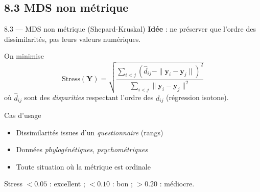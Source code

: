 \subsection{8.3 MDS non métrique}
\begin{frame}{8.3 — MDS non métrique (Shepard-Kruskal)}
\textbf{Idée} : ne préserver que l'\alert{ordre} des dissimilarités, pas leurs
valeurs numériques.

\begin{definition}
On minimise
\[
\text{Stress}(\mathbf{Y}) = \sqrt{\frac{\sum_{i < j}(\hat{d}_{ij} - \|\mathbf{y}_i - \mathbf{y}_j\|)^2}{\sum_{i < j} \|\mathbf{y}_i - \mathbf{y}_j\|^2}}
\]
où $\hat{d}_{ij}$ sont des \emph{disparities} respectant l'ordre des $d_{ij}$
(régression isotone).
\end{definition}

\begin{block}{Cas d'usage}
\begin{itemize}\small
  \item Dissimilarités issues d'un \emph{questionnaire} (rangs)
  \item Données \emph{phylogénétiques}, \emph{psychométriques}
  \item Toute situation où la métrique est ordinale
\end{itemize}
\end{block}

\begin{rema}
\small Stress $< 0.05$ : excellent ; $< 0.10$ : bon ; $> 0.20$ : médiocre.
\end{rema}
\end{frame}

